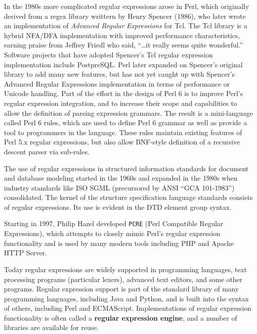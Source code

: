 In the 1980s more complicated regular expressions arose in Perl, which
originally derived from a regex library writtern by Henry Spencer
(1986), who later wrote an implementation of \textsl{Advanced Regular
  Expressions} for Tcl. The Tcl library is a hybrid NFA/DFA
implementation with improved performance characteristics, earning
praise from Jeffrey Friedl who said, ``\ldots it really seems quite
wonderful.'' Software projects that have adopted Spencer's Tcl regular
expression implementation include PostpreSQL. Perl later expanded on
Spencer's original library to add many new features, but has not yet
caught up with Spencer's Advanced Regular Expressions implementation
in terms of performance or Unicode handling. Part of the effort in the
design of Perl 6 is to improve Perl's regular expression integration,
and to increase their scope and capabilities to allow the definition
of parsing expression grammars. The result is a mini-language called
Perl 6 rules, which are used to define Perl 6 grammar as well as
provide a tool to programmers in the language. These rules maintain
existing features of Perl 5.x regular expressions, but also allow
BNF-style definition of a recursive descent parser via sub-rules.

The use of regular expressions in structured information standards for
document and database modeling started in the 1960s and expanded in
the 1980s when industry standards like ISO SGML (precursored by ANSI
``GCA 101-1983'') consolidated. The kernel of the structure
specification language standards consists of regular expressions. Its
use is evident in the DTD element group syntax.

Starting in 1997, Philip Hazel developed \verb|PCRE| (Perl Compatible
Regular Expressions), which attempts to closely mimic Perl's regular
expression functionality and is used by many modern tools including
PHP and Apache HTTP Server.

Today regular expressions are widely supported in programming
languages, text processing programs (particular lexers), advanced text
editors, and some other programs. Regular expression support is part
of the standard library of many programming languages, including Java
and Python, and is built into the syntax of others, including Perl and
ECMAScript. Implementations of regular expression functionality is
often called a \textbf{regular expression engine}, and a number of
libraries are available for reuse.
